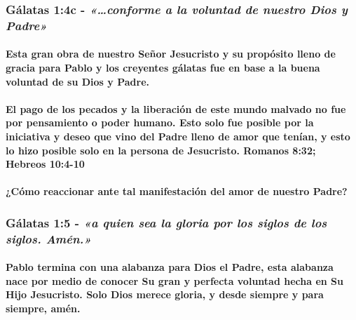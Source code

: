 \documentclass[11a pt,twoside]{article}
\newcommand{\scripture}[1]{%
  {\fontsize{12pt}{16pt}\selectfont\ScriptureFont\itshape #1}%
}
\let\oldsubsubsection\subsubsection
\renewcommand{\subsubsection}{\needspace{4\baselineskip}\oldsubsubsection}
\let\oldparagraph\paragraph
\renewcommand{\paragraph}{\needspace{3\baselineskip}\oldparagraph}
\begin{document}
\subsubsection{\texorpdfstring{Gálatas 1:4c -
\scripture{«…conforme a la voluntad de nuestro Dios y Padre»}}{Gálatas 1:4c - }}\label{guxe1latas-14c---conforme-a-la-voluntad-de-nuestro-dios-y-padre}

\paragraph{Esta gran obra de nuestro Señor Jesucristo y su propósito
lleno de gracia para Pablo y los creyentes gálatas fue en base a la
buena voluntad de su Dios y
Padre.}\label{esta-gran-obra-de-nuestro-seuxf1or-jesucristo-y-su-propuxf3sito-lleno-de-gracia-para-pablo-y-los-creyentes-guxe1latas-fue-en-base-a-la-buena-voluntad-de-su-dios-y-padre.}

\paragraph{El pago de los pecados y la liberación de este mundo malvado
no fue por pensamiento o poder humano. Esto solo fue posible por la
iniciativa y deseo que vino del Padre lleno de amor que tenían, y esto
lo hizo posible solo en la persona de Jesucristo. Romanos 8:32; Hebreos
10:4-10}\label{el-pago-de-los-pecados-y-la-liberaciuxf3n-de-este-mundo-malvado-no-fue-por-pensamiento-o-poder-humano.-esto-solo-fue-posible-por-la-iniciativa-y-deseo-que-vino-del-padre-lleno-de-amor-que-tenuxedan-y-esto-lo-hizo-posible-solo-en-la-persona-de-jesucristo.-romanos-832-hebreos-104-10}

\paragraph{¿Cómo reaccionar ante tal manifestación del amor de nuestro
Padre?}\label{cuxf3mo-reaccionar-ante-tal-manifestaciuxf3n-del-amor-de-nuestro-padre}

\subsubsection{\texorpdfstring{Gálatas 1:5 -
\scripture{«a quien sea la gloria por los siglos de los siglos. Amén.»}}{Gálatas 1:5 - }}\label{guxe1latas-15---a-quien-sea-la-gloria-por-los-siglos-de-los-siglos.-amuxe9n.}

\paragraph{Pablo termina con una alabanza para Dios el Padre, esta
alabanza nace por medio de conocer Su gran y perfecta voluntad hecha en
Su Hijo Jesucristo. Solo Dios merece gloria, y desde siempre y para
siempre,
amén.}\label{pablo-termina-con-una-alabanza-para-dios-el-padre-esta-alabanza-nace-por-medio-de-conocer-su-gran-y-perfecta-voluntad-hecha-en-su-hijo-jesucristo.-solo-dios-merece-gloria-y-desde-siempre-y-para-siempre-amuxe9n.}
\end{document}
